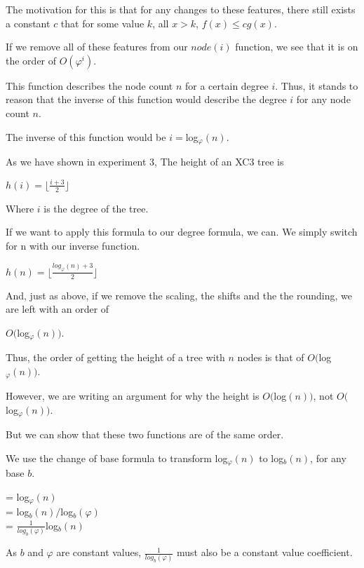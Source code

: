 \documentclass{article}
\begin{document}
The motivation for this is that for any changes to these features, there still exists a constant $c$ that for some value $k$, all $x > k$, $f(x) \leq cg(x)$.

If we remove all of these features from our $node(i)$ function, we see that it is on the order of $O(\varphi^i)$.

This function describes  the node count $n$ for a certain degree $i$. Thus, it stands to reason that the inverse of this function would describe the degree $i$ for any node count $n$.

The inverse of this function would be $i = $log$_{\varphi}(n)$.

As we have shown in experiment 3, The height of an XC3 tree is
{
\begin{center}
    $h(i) = \lfloor \frac{i+3}{2} \rfloor$\\
    $ $
\end{center}
}
Where $i$ is the degree of the tree.

If we want to apply this formula to our degree formula, we can.
We simply switch for n with our inverse function.
{
\begin{center}
    $h(n) = \lfloor \frac{log_{\varphi}(n)+3}{2} \rfloor$\\
    $ $
\end{center}
}
And, just as above, if we remove the scaling, the shifts and the the rounding, we are left with an order of 
    \begin{center}
    $O($log$_{\varphi}(n))$.
    \end{center}
Thus, the order of getting the height of a tree with $n$ nodes is that of $O($log$_{\varphi}(n))$.

However, we are writing an argument for why the height is $O($log$(n))$, not $O($log$_{\varphi}(n))$.

But we can show that these two functions are of the same order.

We use the change of base formula to transform log$_{\varphi}(n)$ to log$_{b}(n)$, for any base $b$.

\begin{center}
    = log$_{\varphi}(n)$\\
    = log$_{b}(n) / $log$_{b}(\varphi)$\\
    = $\frac{1}{log_{b}(\varphi)}$log$_{b}(n)$\\
\end{center}

As $b$ and $\varphi$ are constant values, $\frac{1}{log_{b}(\varphi)}$ must also be a constant value coefficient.
\end{document}
